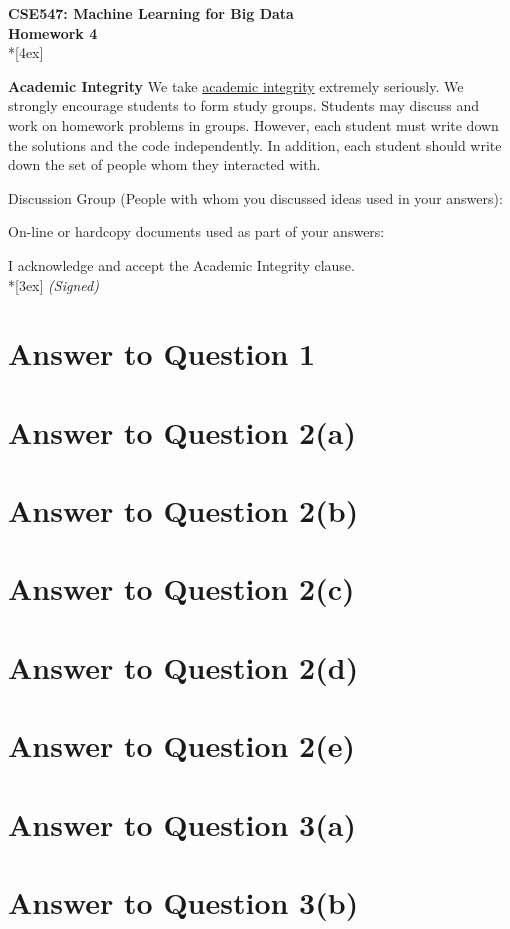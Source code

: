 \documentclass[11pt]{article}
\begin{document}
\thispagestyle{empty}
\parindent 0pt
\vfill
\large

\begin{center}
\LARGE{\bf \textsf{CSE547: Machine Learning for Big Data}}\\ {\bf \textsf{Homework 4}} 
\\*[4ex]
\end{center}

\textbf{Academic Integrity} We take \href{https://www.cs.washington.edu/academics/misconduct}{academic integrity} extremely seriously. 
We strongly encourage students to form study groups. Students may discuss and work on homework problems in groups. However, each student must write down the solutions and the code independently. In addition, each student should write down the set of people whom they interacted with. 
\bigskip

Discussion Group (People with whom you discussed ideas used in your answers): 
\vfill

On-line or hardcopy documents used as part of your answers: 
\vfill

I acknowledge and accept the Academic Integrity clause.\\*[3ex]
\bigskip
\textit{(Signed)}\hrulefill

\pagebreak[4]
\section*{Answer to Question 1}

\pagebreak[4]
\section*{Answer to Question 2(a)}

\pagebreak[4]
\section*{Answer to Question 2(b)}

\pagebreak[4]
\section*{Answer to Question 2(c)}

\pagebreak[4]
\section*{Answer to Question 2(d)}

\pagebreak[4]
\section*{Answer to Question 2(e)}

\pagebreak[4]
\section*{Answer to Question 3(a)}

\pagebreak[4]
\section*{Answer to Question 3(b)}
\end{document}
